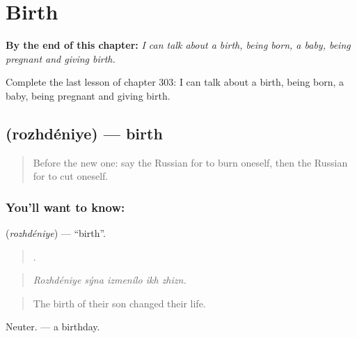 
\chapter{Birth}
\label{ch:ru-birth}

\begin{chapteropening}
\textbf{By the end of this chapter:} \emph{I can talk about a birth, being born, a baby, being pregnant and giving birth.}

Complete the last lesson of chapter 303: I can talk about a birth, being born, a baby, being pregnant and giving birth.
\end{chapteropening}

\section[\texorpdfstring{\ru{рождение} (rozhdéniye)}{рождение (rozhdéniye)}]{ (rozhdéniye) — birth}

\label{lesson:RU-C303-rozhdeniye}



\begin{quote}
Before the new one: say the Russian for to burn oneself, then the Russian for to cut oneself.
\end{quote}

\subsection*{You'll want to know: }
\textbf{} (\emph{rozhdéniye}) — \textquotedblleft{}birth\textquotedblright{}.

\begin{quote}
    .
\end{quote}

\begin{quote}
\emph{Rozhdéniye sýna izmenílo ikh zhizn.}
\end{quote}

\begin{quote}
The birth of their son changed their life.
\end{quote}

Neuter. \emph{ } — a birthday.


